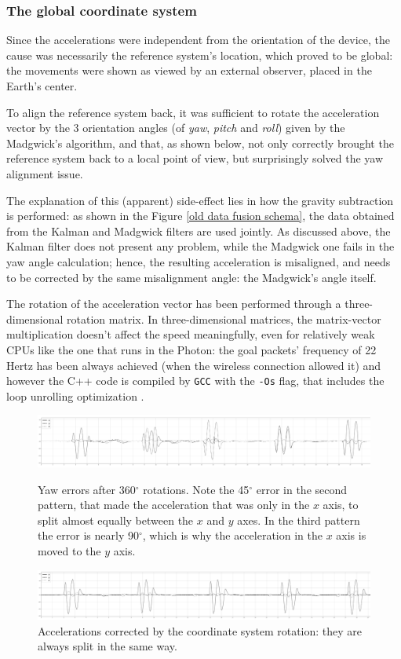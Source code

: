 \subsubsection{The global coordinate system}
Since the accelerations were independent from the orientation of the device, the cause was necessarily the reference system's location, which proved to be global: the movements were shown as viewed by an external observer, placed in the Earth's center.

To align the reference system back, it was sufficient to rotate the acceleration vector by the 3 orientation angles (of \textit{yaw}, \textit{pitch} and \textit{roll}) given by the Madgwick's algorithm, and that, as shown below, not only correctly brought the reference system back to a local point of view, but surprisingly solved the yaw alignment issue.

The explanation of this (apparent) side-effect lies in how the gravity subtraction is performed: as shown in the Figure \ref{old data fusion schema}, the data obtained from the Kalman and Madgwick filters are used jointly. As discussed above, the Kalman filter does not present any problem, while the Madgwick one fails in the yaw angle calculation; hence, the resulting acceleration is misaligned, and needs to be corrected by the same misalignment angle: the Madgwick's angle itself.
\bigbreak

The rotation of the acceleration vector has been performed through a three-dimensional rotation matrix. In three-dimensional matrices, the matrix-vector multiplication doesn't affect the speed meaningfully, even for relatively weak CPUs like the one that runs in the Photon: the goal packets' frequency of 22 Hertz \cite{Pio19} has been always achieved (when the wireless connection allowed it) and however the C++ code is compiled by \texttt{GCC} with the \texttt{-Os} flag, that includes the loop unrolling optimization \cite{UsingGCC}.

\clearpage
\begin{figure}
	\includegraphics[width=\textwidth]{img/plots/drift.png}
	\caption{Yaw errors after 360$^{\circ}$ rotations. Note the 45$^{\circ}$ error in the second pattern, that made the acceleration that was only in the $x$ axis, to split almost equally between the $x$ and $y$ axes. In the third pattern the error is nearly 90$^{\circ}$, which is why the acceleration in the $x$ axis is moved to the $y$ axis.}
	\vspace{2cm}

	\includegraphics[width=\textwidth]{img/plots/nodrift.png}
	\caption{Accelerations corrected by the coordinate system rotation: they are always split in the same way.}
\end{figure}
\clearpage

